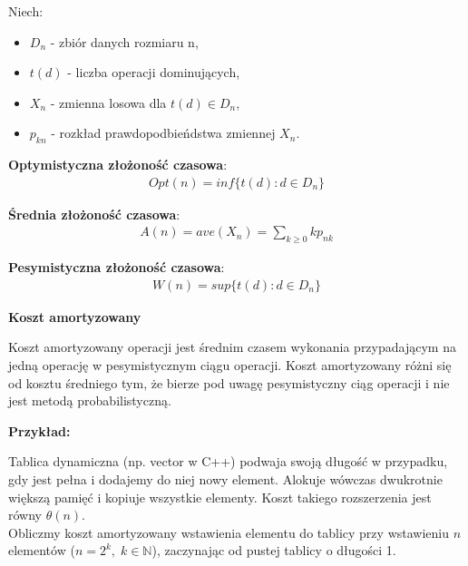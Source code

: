 \documentclass[12pt]{article}
\begin{document}
    \begin{definition}
        Niech:
        \begin{itemize}
            \item $D_n$ - zbiór danych rozmiaru n,
            \item $t(d)$ - liczba operacji dominujących,
            \item $X_n$ - zmienna losowa dla $t(d) \in D_n$,
            \item $p_{kn}$ - rozkład prawdopodbieńdstwa zmiennej $X_n$.
        \end{itemize}

        \textbf{Optymistyczna złożoność czasowa}:
        \begin{align*}
            Opt(n) = inf\{t(d) : d \in D_n\}
        \end{align*}

        \textbf{Średnia złożoność czasowa}:
        \begin{align*}
            A(n) = ave(X_n) = \sum_{k \geq 0}kp_{nk}
        \end{align*}

        \textbf{Pesymistyczna złożoność czasowa}:
        \begin{align*}
            W(n) = sup\{t(d) : d \in D_n\}
        \end{align*}
    \end{definition}

    \begin{definition}
        \textbf{Koszt amortyzowany}

        Koszt amortyzowany operacji jest średnim czasem wykonania przypadającym na jedną operację w pesymistycznym ciągu operacji. Koszt amortyzowany różni się od kosztu średniego tym, że bierze pod uwagę pesymistyczny ciąg operacji i nie jest metodą probabilistyczną.

    \end{definition}

    \textbf{Przykład:}

    Tablica dynamiczna (np. vector w C++) podwaja swoją długość w przypadku, gdy jest pełna i dodajemy do niej nowy element.
    Alokuje wówczas dwukrotnie większą pamięć i kopiuje wszystkie elementy.
    Koszt takiego rozszerzenia jest równy $\theta(n)$.\\

    Obliczmy koszt amortyzowany wstawienia elementu do tablicy przy wstawieniu $n$ elementów ($n = 2^k,\; k \in \mathbb{N}$),
    zaczynając od pustej tablicy o długości 1.
\end{document}
